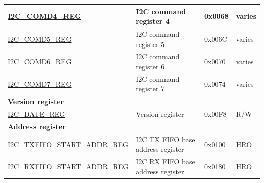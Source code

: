 \begin{longtable}{ | p{6cm} | p{7cm} | p{1.3cm} | p{1cm} | }
\hyperref[regdesc:I2CCOMD4REG]{I2C\_COMD4\_REG} & I2C command register 4 & 0x0068 & varies \\ \hline
\hyperref[regdesc:I2CCOMD5REG]{I2C\_COMD5\_REG} & I2C command register 5 & 0x006C & varies \\ \hline
\hyperref[regdesc:I2CCOMD6REG]{I2C\_COMD6\_REG} & I2C command register 6 & 0x0070 & varies \\ \hline
\hyperref[regdesc:I2CCOMD7REG]{I2C\_COMD7\_REG} & I2C command register 7 & 0x0074 & varies \\ \hline
\multicolumn{4}{|l|}{\textbf{Version register}} \\ \hline
\hyperref[regdesc:I2CDATEREG]{I2C\_DATE\_REG} & Version register & 0x00F8 & R/W \\ \hline
\multicolumn{4}{|l|}{\textbf{Address register}} \\ \hline
\hyperref[regdesc:I2CTXFIFOSTARTADDRREG]{I2C\_TXFIFO\_START\_ADDR\_REG} & I2C TX FIFO base address register & 0x0100 & HRO \\ \hline
\hyperref[regdesc:I2CRXFIFOSTARTADDRREG]{I2C\_RXFIFO\_START\_ADDR\_REG} & I2C RX FIFO base address register & 0x0180 & HRO \\ \hline
\end{longtable}
